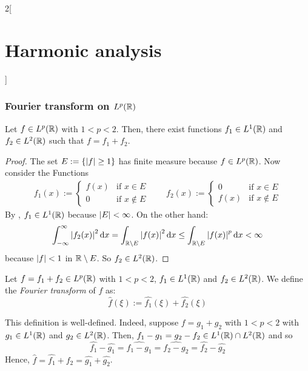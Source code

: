 \documentclass[../../../main_math.tex]{subfiles}
\begin{document}
\begin{multicols}{2}[\section{Harmonic analysis}]
  \subsubsection{Fourier transform on \texorpdfstring{$L^p(\mathbb{R})$}{Lp(R)}}
  \begin{lemma}
    Let $f\in L^p(\mathbb{R})$ with $1<p<2$. Then, there exist functions $f_1\in L^1(\mathbb{R})$ and $f_2\in L^2(\mathbb{R})$ such that $f=f_1+f_2$.
  \end{lemma}
  \begin{proof}
    The set $E:=\{\abs{f}\geq 1\}$ has finite measure because $f\in L^p(\mathbb{R})$. Now consider the Functions
    \begin{gather*}
      f_1(x):=\begin{cases}
        f(x) & \text{if }x\in E    \\
        0    & \text{if }x\notin E
      \end{cases}\qquad
      f_2(x):=\begin{cases}
        0    & \text{if }x\in E    \\
        f(x) & \text{if }x\notin E
      \end{cases}
    \end{gather*}
    By , $f_1\in L^1(\mathbb{R})$ because $\m{E}<\infty$. On the other hand: $$\int_{-\infty}^{\infty}\abs{f_2(x)}^2\dd{x}=\int_{\mathbb{R}\setminus E}\abs{f(x)}^2\dd{x}\leq \int_{\mathbb{R}\setminus E}\abs{f(x)}^p\dd{x}<\infty$$
    because $\abs{f}<1$ in $\mathbb{R}\setminus E$.
    So $f_2\in L^2(\mathbb{R})$.
  \end{proof}
  \begin{definition}
    Let $f=f_1+f_2\in L^p(\mathbb{R})$ with $1<p<2$, $f_1\in L^1(\mathbb{R})$ and $f_2\in L^2(\mathbb{R})$. We define the \emph{Fourier transform} of $f$ as:
    $$\widehat{f}(\xi):=\widehat{f_1}(\xi)+\widehat{f_2}(\xi)$$
  \end{definition}
  \begin{remark}
    This definition is well-defined. Indeed, suppose $f=g_1+g_2$ with $1<p<2$ with $g_1\in L^1(\mathbb{R})$ and $g_2\in L^2(\mathbb{R})$. Then, $f_1-g_1=g_2-f_2\in L^1(\mathbb{R})\cap L^2(\mathbb{R})$ and so $$\widehat{f_1}-\widehat{g_1}=\widehat{f_1-g_1}=\widehat{f_2-g_2}=\widehat{f_2}-\widehat{g_2}$$
    Hence, $\widehat{f}=\widehat{f_1}+\widehat{f_2}=\widehat{g_1}+\widehat{g_2}$.
  \end{remark}

\end{multicols}
\end{document}
